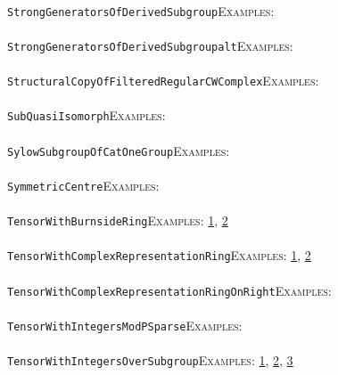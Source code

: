 \documentclass[a4paper,11pt]{report}
\begin{document}
{{ \\
 \texttt{StrongGeneratorsOfDerivedSubgroup}{\nobreakspace}{\nobreakspace}{\nobreakspace}{\nobreakspace}\textsc{Examples:} \\
 \\
 \texttt{StrongGeneratorsOfDerivedSubgroup{\textunderscore}alt}{\nobreakspace}{\nobreakspace}{\nobreakspace}{\nobreakspace}\textsc{Examples:} \\
 \\
 \texttt{StructuralCopyOfFilteredRegularCWComplex}{\nobreakspace}{\nobreakspace}{\nobreakspace}{\nobreakspace}\textsc{Examples:} \\
 \\
 \texttt{SubQuasiIsomorph}{\nobreakspace}{\nobreakspace}{\nobreakspace}{\nobreakspace}\textsc{Examples:} \\
 \\
 \texttt{SylowSubgroupOfCatOneGroup}{\nobreakspace}{\nobreakspace}{\nobreakspace}{\nobreakspace}\textsc{Examples:} \\
 \\
 \texttt{SymmetricCentre}{\nobreakspace}{\nobreakspace}{\nobreakspace}{\nobreakspace}\textsc{Examples:} \\
 \\
 \texttt{TensorWithBurnsideRing}{\nobreakspace}{\nobreakspace}{\nobreakspace}{\nobreakspace}\textsc{Examples:} \href{tutorial/chap8.html} {1}{\nobreakspace}, \href{../www/SideLinks/About/aboutBredon.html} {2}{\nobreakspace} \\
 \\
 \texttt{TensorWithComplexRepresentationRing}{\nobreakspace}{\nobreakspace}{\nobreakspace}{\nobreakspace}\textsc{Examples:} \href{tutorial/chap8.html} {1}{\nobreakspace}, \href{../www/SideLinks/About/aboutBredon.html} {2}{\nobreakspace} \\
 \\
 \texttt{TensorWithComplexRepresentationRingOnRight}{\nobreakspace}{\nobreakspace}{\nobreakspace}{\nobreakspace}\textsc{Examples:} \\
 \\
 \texttt{TensorWithIntegersModPSparse}{\nobreakspace}{\nobreakspace}{\nobreakspace}{\nobreakspace}\textsc{Examples:} \\
 \\
 \texttt{TensorWithIntegersOverSubgroup}{\nobreakspace}{\nobreakspace}{\nobreakspace}{\nobreakspace}\textsc{Examples:} \href{tutorial/chap3.html} {1}{\nobreakspace}, \href{../www/SideLinks/About/aboutCoveringSpaces.html} {2}{\nobreakspace}, \href{../www/SideLinks/About/aboutCoverinSpaces.html} {3}{\nobreakspace} \\
}}
\end{document}
